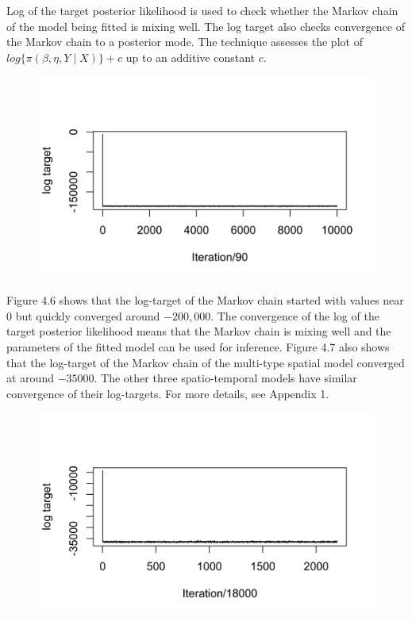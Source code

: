 \documentclass[12pt,a4paper]{report}
\begin{document}
Log of the target posterior likelihood is used to check whether the Markov chain of the model being fitted is mixing well. The log target also checks convergence of the Markov chain to a posterior mode. The technique assesses the plot of $log\lbrace \pi\left( \beta, \eta, Y \mid X \right) \rbrace + c$ up to an additive constant $c$.

\begin{figure}[H]
\begin{center}
\includegraphics{Log Target Plot - ST - All Cases.png}
\end{center}
\end{figure}

Figure 4.6 shows that the log-target of the Markov chain started with values near $0$ but quickly converged around $-200,000$. The convergence of the log of the target posterior likelihood means that the Markov chain is mixing well and the parameters of the fitted model can be used for inference. Figure 4.7 also shows that the log-target of the Markov chain of the multi-type spatial model converged at around $-35000$. The other three spatio-temporal models have similar convergence of their log-targets. For more details, see Appendix 1.

\begin{figure}[H]
\begin{center}
\includegraphics{Log Target - Multi-type.png}
\end{center}
\end{figure}
\end{document}
